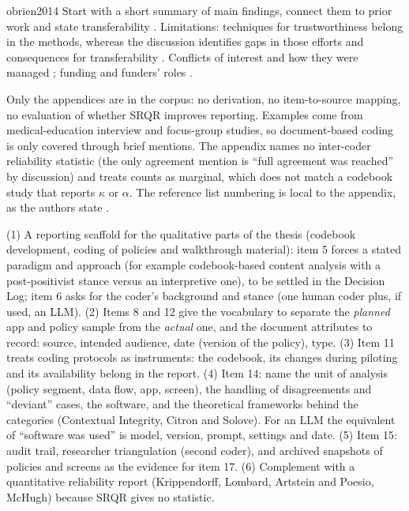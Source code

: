 \begin{papercard}{obrien2014}
 Start with a short summary of main findings, connect them to prior work and state transferability . Limitations: techniques for trustworthiness belong in the methods, whereas the discussion identifies gaps in those efforts and consequences for transferability . Conflicts of interest and how they were managed ; funding and funders' roles .

 Only the appendices are in the corpus: no derivation, no item-to-source mapping, no evaluation of whether SRQR improves reporting. Examples come from medical-education interview and focus-group studies, so document-based coding is only covered through brief mentions. The appendix names no inter-coder reliability statistic (the only agreement mention is ``full agreement was reached'' by discussion) and treats counts as marginal, which does not match a codebook study that reports $\kappa$ or $\alpha$. The reference list numbering is local to the appendix, as the authors state .

 (1) A reporting scaffold for the qualitative parts of the thesis (codebook development, coding of policies and walkthrough material): item 5 forces a stated paradigm and approach (for example codebook-based content analysis with a post-positivist stance versus an interpretive one), to be settled in the Decision Log; item 6 asks for the coder's background and stance (one human coder plus, if used, an LLM). (2) Items 8 and 12 give the vocabulary to separate the \emph{planned} app and policy sample from the \emph{actual} one, and the document attributes to record: source, intended audience, date (version of the policy), type. (3) Item 11 treats coding protocols as instruments: the codebook, its changes during piloting and its availability belong in the report. (4) Item 14: name the unit of analysis (policy segment, data flow, app, screen), the handling of disagreements and ``deviant'' cases, the software, and the theoretical frameworks behind the categories (Contextual Integrity, Citron and Solove). For an LLM the equivalent of ``software was used'' is model, version, prompt, settings and date. (5) Item 15: audit trail, researcher triangulation (second coder), and archived snapshots of policies and screens as the evidence for item 17. (6) Complement with a quantitative reliability report (Krippendorff, Lombard, Artstein and Poesio, McHugh) because SRQR gives no statistic.
\end{papercard}
